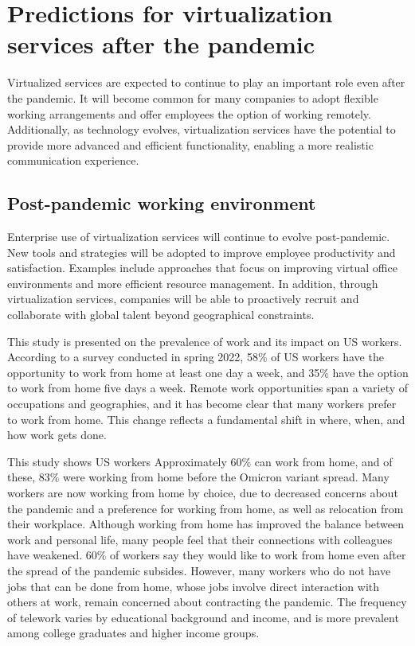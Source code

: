 \documentclass[12pt]{article}
\begin{document}
\section{Predictions for virtualization services after the pandemic}
Virtualized services are expected to continue to play an
important role even after the pandemic. It will become common for many
companies to adopt flexible working arrangements and offer employees the option
of working remotely. Additionally, as technology evolves, virtualization
services have the potential to provide more advanced and efficient
functionality, enabling a more realistic communication experience.

\subsection{Post-pandemic working environment}
Enterprise use of virtualization services will continue to evolve
post-pandemic. New tools and strategies will be adopted to improve employee
productivity and satisfaction. Examples include approaches that focus on
improving virtual office environments and more efficient resource management.
In addition, through virtualization services, companies will be able to
proactively recruit and collaborate with global talent beyond geographical
constraints.

This study \cite{americans_embracing} is presented on the prevalence of work
and its
impact on US
workers. According to a survey conducted in spring 2022, 58\% of US
workers have the opportunity to work from home at least one day a week, and
35\% have the option to work from home five days a week. Remote work
opportunities span a variety of occupations and geographies, and it has become
clear that many workers prefer to work from home. This change reflects a
fundamental shift in where, when, and how work gets done.

This study \cite{covid_reshaping} shows US workers Approximately 60\% can
work
from home, and of these, 83\% were
working from home before the Omicron variant spread. Many workers are now
working from home by choice, due to decreased concerns about the pandemic
and a preference for working from home, as well as relocation from their
workplace. Although working from home has improved the balance between work and
personal life, many people feel that their connections with colleagues have
weakened. 60\% of workers say they would like to work from home even after the
spread of the pandemic subsides. However, many workers who do not have jobs
that can be done from home, whose jobs involve direct interaction with others
at work, remain concerned about contracting the pandemic. The frequency of
telework varies by educational background and income, and is more prevalent
among college graduates and higher income groups.
\end{document}
